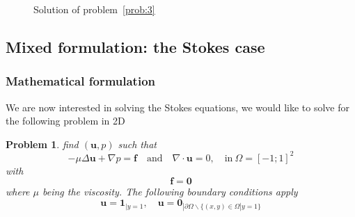 \documentclass[a4paper]{book}
\newtheorem{problem}{Problem}
\begin{document}
\begin{figure}[htbp]
  \centering
  \caption{Solution of problem~\ref{prob:3}}
  \label{fig:2}
\end{figure}

\subsection{Mixed formulation: the Stokes case}
\label{sec:mixed-form-stok}
\subsubsection{Mathematical formulation}
\label{sec:math-form}

  We are now interested in solving
the Stokes equations, we would like to solve for the following problem
in 2D
\begin{problem}
\label{prob:4}
 find $(\mathbf{u},p)$ such that
\begin{equation}
  \label{eq:22}
  - \mu \Delta \mathbf{u} +\nabla p = \mathbf{f}\quad \text{and}\quad \nabla \cdot \mathbf{u} = 0,\quad \text{in}\ \Omega = [-1;1]^2
\end{equation}
with
\begin{equation}
  \label{eq:24}
  \mathbf{f} = \mathbf{0}
\end{equation}
where $\mu$ being the viscosity. The following boundary conditions apply
\begin{equation}
  \label{eq:23}
  \mathbf{u}=\mathbf{1}_{|y=1}, \quad \mathbf{u}=\mathbf{0}_{|\partial \Omega \backslash \{(x,y) \in \Omega | y=1\}}
\end{equation}
\end{problem}
\end{document}
